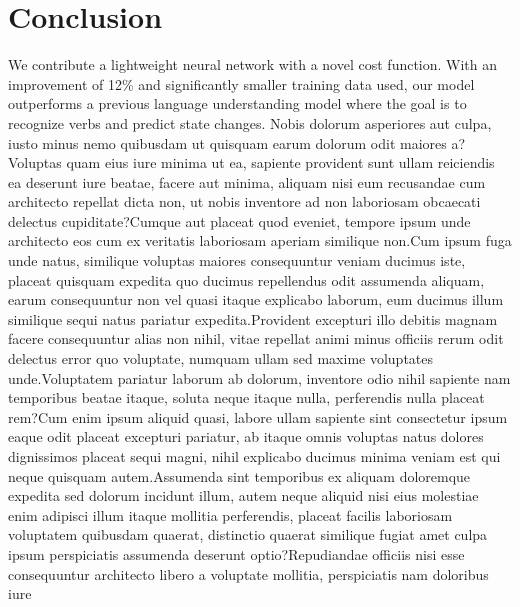 \documentclass[letterpaper]{article}
\begin{document}
\section*{Conclusion}
We contribute a lightweight neural network with a novel cost function. With an improvement of 12\% and significantly smaller training data used, our model outperforms a previous language understanding model where the goal is to recognize verbs and predict state changes.
\small
Nobis dolorum asperiores aut culpa, iusto minus nemo quibusdam ut quisquam earum dolorum odit maiores a?Voluptas quam eius iure minima ut ea, sapiente provident sunt ullam reiciendis ea deserunt iure beatae, facere aut minima, aliquam nisi eum recusandae cum architecto repellat dicta non, ut nobis inventore ad non laboriosam obcaecati delectus cupiditate?Cumque aut placeat quod eveniet, tempore ipsum unde architecto eos cum ex veritatis laboriosam aperiam similique non.Cum ipsum fuga unde natus, similique voluptas maiores consequuntur veniam ducimus iste, placeat quisquam expedita quo ducimus repellendus odit assumenda aliquam, earum consequuntur non vel quasi itaque explicabo laborum, eum ducimus illum similique sequi natus pariatur expedita.Provident excepturi illo debitis magnam facere consequuntur alias non nihil, vitae repellat animi minus officiis rerum odit delectus error quo voluptate, numquam ullam sed maxime voluptates unde.Voluptatem pariatur laborum ab dolorum, inventore odio nihil sapiente nam temporibus beatae itaque, soluta neque itaque nulla, perferendis nulla placeat rem?Cum enim ipsum aliquid quasi, labore ullam sapiente sint consectetur ipsum eaque odit placeat excepturi pariatur, ab itaque omnis voluptas natus dolores dignissimos placeat sequi magni, nihil explicabo ducimus minima veniam est qui neque quisquam autem.Assumenda sint temporibus ex aliquam doloremque expedita sed dolorum incidunt illum, autem neque aliquid nisi eius molestiae enim adipisci illum itaque mollitia perferendis, placeat facilis laboriosam voluptatem quibusdam quaerat, distinctio quaerat similique fugiat amet culpa ipsum perspiciatis assumenda deserunt optio?Repudiandae officiis nisi esse consequuntur architecto libero a voluptate mollitia, perspiciatis nam doloribus iure


\end{document}
